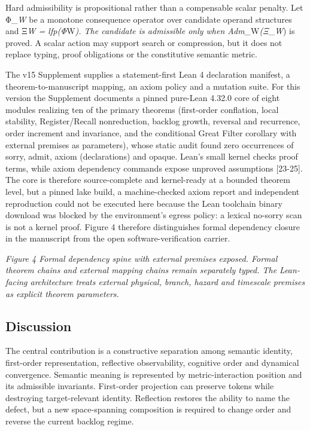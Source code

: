 Hard admissibility is propositional rather than a compensable scalar
penalty. Let Φ\_\emph{W} be a monotone consequence operator over
candidate operand structures and Ξ\emph{\emph{\emph{W} =
lfp(Φ}}W\emph{). The candidate is admissible only when
Adm\_}W\emph{(Ξ}\_\emph{W}) is proved. A scalar action may support
search or compression, but it does not replace typing, proof obligations
or the constitutive semantic metric.

The v15 Supplement supplies a statement-first Lean 4 declaration
manifest, a theorem-to-manuscript mapping, an axiom policy and a
mutation suite. For this version the Supplement documents a pinned
pure-Lean 4.32.0 core of eight modules realizing ten of the primary
theorems (first-order conflation, local stability, Register/Recall
nonreduction, backlog growth, reversal and recurrence, order increment
and invariance, and the conditional Great Filter corollary with external
premises as parameters), whose static audit found zero occurrences of
sorry, admit, axiom (declarations) and opaque. Lean's small kernel
checks proof terms, while axiom dependency commands expose unproved
assumptions {[}23-25{]}. The core is therefore source-complete and
kernel-ready at a bounded theorem level, but a pinned lake build, a
machine-checked axiom report and independent reproduction could not be
executed here because the Lean toolchain binary download was blocked by
the environment's egress policy: a lexical no-sorry scan is not a kernel
proof. Figure 4 therefore distinguishes formal dependency closure in the
manuscript from the open software-verification carrier.

\emph{Figure 4 \textbar{} Formal dependency spine with external premises
exposed. Formal theorem chains and external mapping chains remain
separately typed. The Lean-facing architecture treats external physical,
branch, hazard and timescale premises as explicit theorem parameters.}

\hypertarget{discussion}{%
\subsection{Discussion}\label{discussion}}

The central contribution is a constructive separation among semantic
identity, first-order representation, reflective observability,
cognitive order and dynamical convergence. Semantic meaning is
represented by metric-interaction position and its admissible
invariants. First-order projection can preserve tokens while destroying
target-relevant identity. Reflection restores the ability to name the
defect, but a new space-spanning composition is required to change order
and reverse the current backlog regime.

